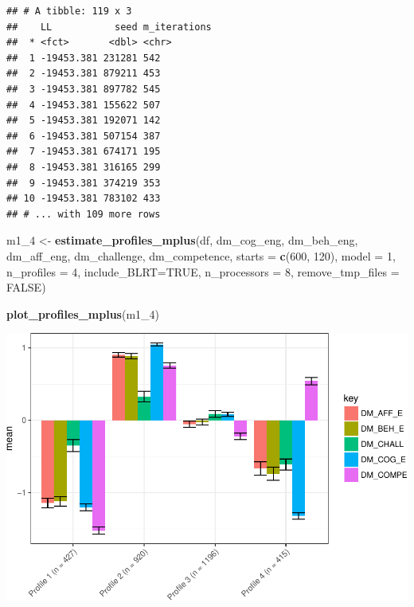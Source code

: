 \documentclass[]{book}
\newenvironment{Shaded}{\begin{snugshade}}{\end{snugshade}}
\newcommand{\KeywordTok}[1]{\textcolor[rgb]{0.13,0.29,0.53}{\textbf{#1}}}
\newcommand{\DataTypeTok}[1]{\textcolor[rgb]{0.13,0.29,0.53}{#1}}
\newcommand{\DecValTok}[1]{\textcolor[rgb]{0.00,0.00,0.81}{#1}}
\newcommand{\StringTok}[1]{\textcolor[rgb]{0.31,0.60,0.02}{#1}}
\newcommand{\OtherTok}[1]{\textcolor[rgb]{0.56,0.35,0.01}{#1}}
\newcommand{\NormalTok}[1]{#1}
\begin{document}
\begin{verbatim}
## # A tibble: 119 x 3
##    LL           seed m_iterations
##  * <fct>       <dbl> <chr>       
##  1 -19453.381 231281 542         
##  2 -19453.381 879211 453         
##  3 -19453.381 897782 545         
##  4 -19453.381 155622 507         
##  5 -19453.381 192071 142         
##  6 -19453.381 507154 387         
##  7 -19453.381 674171 195         
##  8 -19453.381 316165 299         
##  9 -19453.381 374219 353         
## 10 -19453.381 783102 433         
## # ... with 109 more rows
\end{verbatim}

\begin{Shaded}
\begin{Highlighting}[]
\NormalTok{m1_}\DecValTok{4}\NormalTok{ <-}\StringTok{ }\KeywordTok{estimate_profiles_mplus}\NormalTok{(df,  }
\NormalTok{                             dm_cog_eng, dm_beh_eng, dm_aff_eng, dm_challenge, dm_competence,}
                             \DataTypeTok{starts =} \KeywordTok{c}\NormalTok{(}\DecValTok{600}\NormalTok{, }\DecValTok{120}\NormalTok{),}
                             \DataTypeTok{model =} \DecValTok{1}\NormalTok{,}
                             \DataTypeTok{n_profiles =} \DecValTok{4}\NormalTok{,}
                             \DataTypeTok{include_BLRT=}\OtherTok{TRUE}\NormalTok{,}
                             \DataTypeTok{n_processors =} \DecValTok{8}\NormalTok{, }\DataTypeTok{remove_tmp_files =} \OtherTok{FALSE}\NormalTok{)}

\KeywordTok{plot_profiles_mplus}\NormalTok{(m1_}\DecValTok{4}\NormalTok{)}
\end{Highlighting}
\end{Shaded}

\includegraphics{rosenberg-dissertation_files/figure-latex/spec-solutions-model1-2.pdf}
\end{document}
